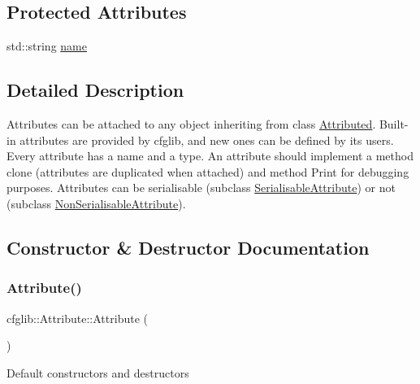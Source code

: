 \subsection*{Protected Attributes}
\begin{DoxyCompactItemize}
\item 
std\+::string \hyperlink{classcfglib_1_1Attribute_a9abcd440f01bbbc57fc64f274033cd22}{name}
\end{DoxyCompactItemize}


\subsection{Detailed Description}
Attributes can be attached to any object inheriting from class \hyperlink{classcfglib_1_1Attributed}{Attributed}. Built-\/in attributes are provided by cfglib, and new ones can be defined by its users. Every attribute has a name and a type. An attribute should implement a method clone (attributes are duplicated when attached) and method Print for debugging purposes. Attributes can be serialisable (subclass \hyperlink{classcfglib_1_1SerialisableAttribute}{Serialisable\+Attribute}) or not (subclass \hyperlink{classcfglib_1_1NonSerialisableAttribute}{Non\+Serialisable\+Attribute}). 

\subsection{Constructor \& Destructor Documentation}
\mbox{\label{classcfglib_1_1Attribute_ac6c6631f3f1a7077a7f3cdd654f4d194}} 
\subsubsection{\texorpdfstring{Attribute()}{Attribute()}}
{\footnotesize\ttfamily cfglib\+::\+Attribute\+::\+Attribute (\begin{DoxyParamCaption}{ }\end{DoxyParamCaption})\hspace{0.3cm}{\ttfamily [inline]}}

Default constructors and destructors \mbox{\label{classcfglib_1_1Attribute_af8f971cd97eda6e23c35f1afae0a8c66}} 
